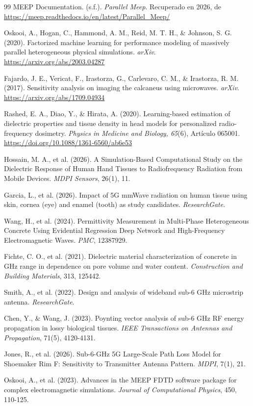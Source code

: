 \begin{thebibliography}{99}
MEEP Documentation. (s.f.). \textit{Parallel Meep}. Recuperado en 2026, de \url{https://meep.readthedocs.io/en/latest/Parallel_Meep/}

Oskooi, A., Hogan, C., Hammond, A. M., Reid, M. T. H., \& Johnson, S. G. (2020). Factorized machine learning for performance modeling of massively parallel heterogeneous physical simulations. \textit{arXiv}. \url{https://arxiv.org/abs/2003.04287}

Fajardo, J. E., Vericat, F., Irastorza, G., Carlevaro, C. M., \& Irastorza, R. M. (2017). Sensitivity analysis on imaging the calcaneus using microwaves. \textit{arXiv}. \url{https://arxiv.org/abs/1709.04934}

Rashed, E. A., Diao, Y., \& Hirata, A. (2020). Learning-based estimation of dielectric properties and tissue density in head models for personalized radio-frequency dosimetry. \textit{Physics in Medicine and Biology, 65}(6), Artículo 065001. \url{https://doi.org/10.1088/1361-6560/ab6e53}

 Hossain, M. A., et al. (2026). A Simulation-Based Computational Study on the Dielectric Response of Human Hand Tissues to Radiofrequency Radiation from Mobile Devices. \textit{MDPI Sensors}, 26(1), 11.

 Garcia, L., et al. (2026). Impact of 5G mmWave radiation on human tissue using skin, cornea (eye) and enamel (tooth) as study candidates. \textit{ResearchGate}.

 Wang, H., et al. (2024). Permittivity Measurement in Multi-Phase Heterogeneous Concrete Using Evidential Regression Deep Network and High-Frequency Electromagnetic Waves. \textit{PMC}, 12387929.

 Fichte, C. O., et al. (2021). Dielectric material characterization of concrete in GHz range in dependence on pore volume and water content. \textit{Construction and Building Materials}, 313, 125442.

 Smith, A., et al. (2022). Design and analysis of wideband sub-6 GHz microstrip antenna. \textit{ResearchGate}.

 Chen, Y., \& Wang, J. (2023). Poynting vector analysis of sub-6 GHz RF energy propagation in lossy biological tissues. \textit{IEEE Transactions on Antennas and Propagation}, 71(5), 4120-4131.

 Jones, R., et al. (2026). Sub-6-GHz 5G Large-Scale Path Loss Model for Shoemaker Rim F: Sensitivity to Transmitter Antenna Pattern. \textit{MDPI}, 7(1), 21.

 Oskooi, A., et al. (2023). Advances in the MEEP FDTD software package for complex electromagnetic simulations. \textit{Journal of Computational Physics}, 450, 110-125.

\end{thebibliography}
